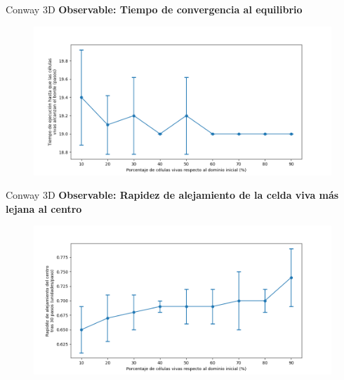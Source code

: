 \begin{frame}{Conway 3D}
    \textbf{Observable: Tiempo de convergencia al equilibrio}
    \begin{figure}[H]
        \centering
        \includegraphics[width=0.8\linewidth]{pic/conway3d/time_vs_input}
        \label{fig:conway3d:time:density}
    \end{figure}
\end{frame}

\begin{frame}{Conway 3D}
    \textbf{Observable: Rapidez de alejamiento de la celda viva más lejana al centro}
    \begin{figure}[H]
        \centering
        \includegraphics[width=0.8\linewidth]{pic/conway3d/distance_slope_vs_input}
        \label{fig:conway3d:distance_slope:density}
    \end{figure}
\end{frame}




